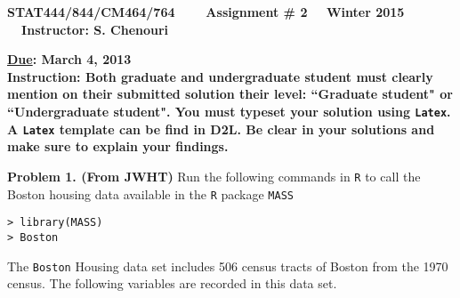 \documentclass[11pt]{report}
\begin{document}
\begin{center}
{\bf STAT444/844/CM464/764 ~~~ Assignment \# 2 ~~Winter 2015 ~~Instructor: S. Chenouri}
\end{center} 
\noindent
{\bf \underline {Due}: March 4, 2013}\\

\noindent
{\bf Instruction: Both graduate and undergraduate student must clearly mention on their submitted solution their level: ``Graduate student" or ``Undergraduate student". You must typeset your solution using {\tt Latex}. A  {\tt Latex} template can be find in D2L. Be clear in your solutions and make sure to explain your findings.} \\
\vspace{1mm}

\noindent
{\bf Problem 1. (From JWHT)}   Run the following commands in {\tt R} to call the Boston housing data available in the {\tt R} package {\tt MASS}
\begin{verbatim}
> library(MASS)
> Boston
\end{verbatim}
The {\tt Boston} Housing data set includes 506 census tracts of Boston from the 1970 census. The following variables are recorded in this data set.
\end{document}
